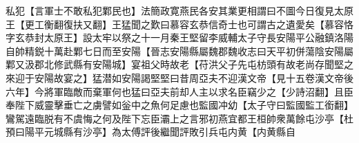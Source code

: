 私犯【言軍士不敢私犯鄴民也】法簡政寛燕民各安其業更相謂曰不圖今日復見太原王【更工衡翻復扶又翻】王猛聞之歎曰慕容玄恭信奇士也可謂古之遺愛矣【慕容恪字玄恭封太原王】設太牢以祭之十一月秦王堅留李威輔太子守長安陽平公融鎮洛陽自帥精鋭十萬赴鄴七日而至安陽【晉志安陽縣屬魏郡魏收志曰天平初併蕩陰安陽屬鄴又汲郡北修武縣有安陽城】宴祖父時故老【苻洪父子先屯枋頭有故老尚存聞堅之來迎于安陽故宴之】猛潜如安陽謁堅堅曰昔周亞夫不迎漢文帝【見十五卷漢文帝後六年】今將軍臨敵而棄軍何也猛曰亞夫前却人主以求名臣竊少之【少詩沼翻】且臣奉陛下威靈擊垂亡之虜譬如釡中之魚何足慮也監國冲幼【太子守曰監國監工銜翻】鸞駕遠臨脱有不虞悔之何及陛下忘臣灞上之言邪初燕宜都王桓帥衆萬餘屯沙亭【杜預曰陽平元城縣有沙亭】為太傅評後繼聞評敗引兵屯内黄【内黄縣自